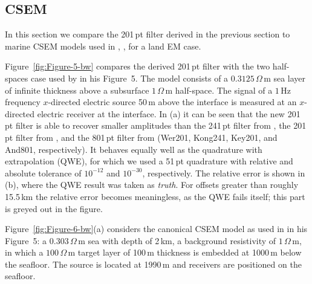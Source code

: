 \documentclass[paper,twocolumn,twoside]{geophysics}
\begin{document}
\subsection{CSEM}
In this section we compare the 201\,pt filter derived in the previous section
to marine CSEM models  used in \cite{GP.07.Kong}, 
\cite{GEO.12.Key},  for a land EM case.

Figure~\ref{fig:Figure-5-bw} compares the derived 201\,pt filter with the two
half-spaces case used by \cite{GP.07.Kong} in his Figure~5. The model consists
of a $0.3125\,\Omega\,$m sea layer of infinite thickness above a subsurface
$1\,\Omega\,$m half-space. The signal of a $1\,$Hz frequency $x$-directed
electric source 50\,m above the interface is measured at an $x$-directed
electric receiver at the interface.
%
%
In (a) it can be seen that the new 201\,pt filter is able to recover smaller
amplitudes than the 241\,pt filter from \cite{GP.07.Kong}, the 201\,pt filter
from \cite{GEO.12.Key}, and the 801\,pt filter from \cite{TMS.82.Anderson}
(Wer201, Kong241, Key201, and And801, respectively). It behaves equally well as
the quadrature with extrapolation (QWE), for which we used a 51\,pt quadrature
with relative and absolute tolerance of $10^{-12}$ and $10^{-30}$,
respectively. The relative error is shown in (b), where the QWE result was
taken as \emph{truth}. For offsets greater than roughly 15.5\,km the relative
error becomes meaningless, as the QWE fails itself; this part is greyed out in
the figure.

Figure~\ref{fig:Figure-6-bw}(a) considers the canonical CSEM model as used in
\cite{GEO.12.Key} in his Figure~5: a $0.303\,\Omega\,$m sea with depth of
2\,km, a background resistivity of $1\,\Omega\,$m, in which a $100\,\Omega\,$m
target layer of 100\,m thickness is embedded at 1000\,m below the seafloor.
The source is located at 1990\,m and receivers are positioned on the seafloor.
%
%
\end{document}
